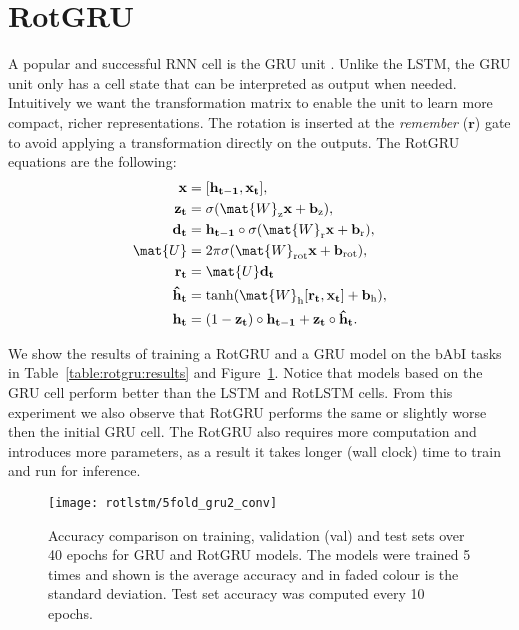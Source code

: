 \documentclass{article}
\begin{document}
\section{RotGRU}

A popular and successful \ac{RNN} cell is the \ac{GRU} unit \citep{cho2014learning}. Unlike the \ac{LSTM}, the \ac{GRU} unit only has a cell state that can be interpreted as output when needed. Intuitively we want the transformation matrix to enable the unit to learn more compact, richer representations. The rotation is inserted at the \emph{remember} ($\mathbf{r}$) gate to avoid applying a transformation directly on the outputs. The RotGRU equations are the following:
\begin{align}
	\mathbf{x} &= [\mathbf{h_{t-1}},  \mathbf{x_t}], \\
	\mathbf{z_t} &= \sigma(\mat{W}_{\text{z}} \mathbf{x} + \mathbf{b}_\text{z}), \\
	\mathbf{d_t} &= \mathbf{h_{t-1}} \circ \sigma(\mat{W}_{\text{r}} \mathbf{x} + \mathbf{b}_\text{r}), \\
	\mat{U} &= 2\pi\sigma(\mat{W}_{\text{rot}} \mathbf{x} + \mathbf{b}_\text{rot}), \\
	\mathbf{r_t} &= \mat{U}\mathbf{d_t} \\
	\mathbf{\hat{h}_t} &= \tanh(\mat{W}_\text{h}[\mathbf{r_t}, \mathbf{x_t}] + \mathbf{b}_\text{h}), \\
	\mathbf{\mathbf{h}_t} &= (1-\mathbf{z_t}) \circ \mathbf{h_{t-1}} + \mathbf{z_t} \circ \mathbf{\hat{h}_t}.
\end{align}

We show the results of training a RotGRU and a GRU model on the bAbI tasks in Table~\ref{table:rotgru:results} and Figure~\ref{fig:rotgru_converge}. Notice that models based on the GRU cell perform better than the LSTM and RotLSTM cells. From this experiment we also observe that RotGRU performs the same or slightly worse then the initial GRU cell. The RotGRU also requires more computation and introduces more parameters, as a result it takes longer (wall clock) time to train and run for inference.



\begin{figure}[htb]
\begin{center}
\texttt{[image: rotlstm/5fold\_gru2\_conv]}
\end{center}
\caption[GRU and RotGRU results on bAbI]{Accuracy comparison on training, validation (val) and test sets over 40 epochs for GRU and RotGRU models. The models were trained 5 times and shown is the average accuracy and in faded colour is the standard deviation. Test set accuracy was computed every 10 epochs.}
\label{fig:rotgru_converge}
\end{figure}
\end{document}
